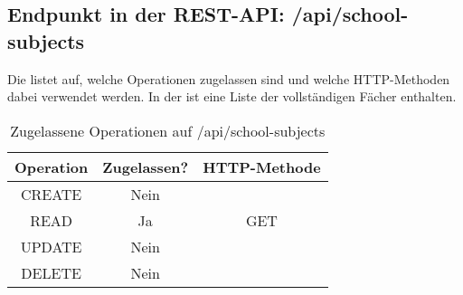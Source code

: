 \subsection{Endpunkt in der REST-API: /api/school-subjects}
\label{sec:end:rest:api:school-subjects}
Die  listet auf, welche Operationen zugelassen sind und welche HTTP-Methoden dabei verwendet werden. 
In der  ist eine Liste der vollständigen Fächer enthalten.

\begin{table}[!htbp]
	\begin{tabular}{|c|c|c|}
		\hline
			\textbf{Operation} & \textbf{Zugelassen?} & \textbf{HTTP-Methode} \\ \hline
			CREATE & Nein & \\ \hline 
			READ & Ja & GET \\ \hline
			UPDATE & Nein & \\ \hline 
			DELETE & Nein & \\ \hline
	\end{tabular}

		\caption{Zugelassene Operationen auf /api/school-subjects}
		\label{tab:end:rest:api:school-subjects:meth}
\end{table}

%

%
%